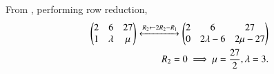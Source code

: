 From 
		 ,
performing row reduction, 
\begin{align}
 \begin{pmatrix}2&6&27 \\ 1& \lambda & \mu\end{pmatrix}
	\xleftrightarrow{R_{2}\leftarrow 2R_{2}-R_{1}}  	
 \begin{pmatrix}2&6&27 \\ 0& 2\lambda -6 & 2\mu-27\end{pmatrix}
 \\
 R_2 = 0 \implies
	\mu=\frac{27}{2},
	\lambda=3.
\end{align}

